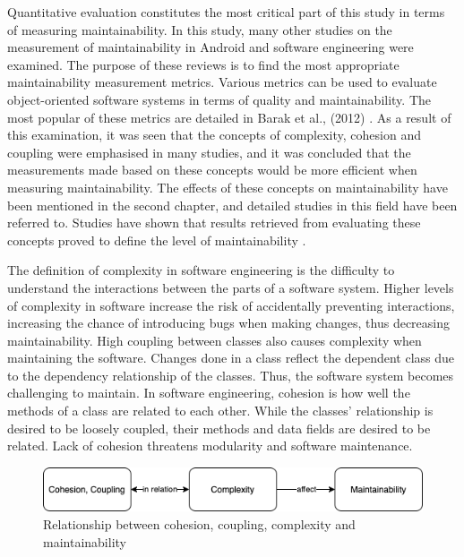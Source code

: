 Quantitative evaluation constitutes the most critical part of this study in terms of measuring maintainability. In this study, many other studies on the measurement of maintainability in Android and software engineering were examined. The purpose of these reviews is to find the most appropriate maintainability measurement metrics. Various metrics can be used to evaluate object-oriented software systems in terms of quality and maintainability. The most popular of these metrics are detailed in Barak et al., (2012) \cite{33}. As a result of this examination, it was seen that the concepts of complexity, cohesion and coupling were emphasised in many studies, and it was concluded that the measurements made based on these concepts would be more efficient when measuring maintainability. The effects of these concepts on maintainability have been mentioned in the second chapter, and detailed studies in this field have been referred to. Studies have shown that results retrieved from evaluating these concepts proved to define the level of maintainability \cite{33}.

The definition of complexity in software engineering is the difficulty to understand the interactions between the parts of a software system. Higher levels of complexity in software increase the risk of accidentally preventing interactions, increasing the chance of introducing bugs when making changes, thus decreasing maintainability. High coupling between classes also causes complexity when maintaining the software. Changes done in a class reflect the dependent class due to the dependency relationship of the classes. Thus, the software system becomes challenging to maintain. In software engineering, cohesion is how well the methods of a class are related to each other. While the classes' relationship is desired to be loosely coupled, their methods and data fields are desired to be related. Lack of cohesion threatens modularity and software maintenance. 
\begin{figure}[ht!]
    \centering
    \includegraphics[scale=0.5]{figures/maintainability_factors.png}
    \caption{Relationship between cohesion, coupling, complexity and maintainability \protect\cite{33}}
    \label{fig:maintainability_factors}
\end{figure}

